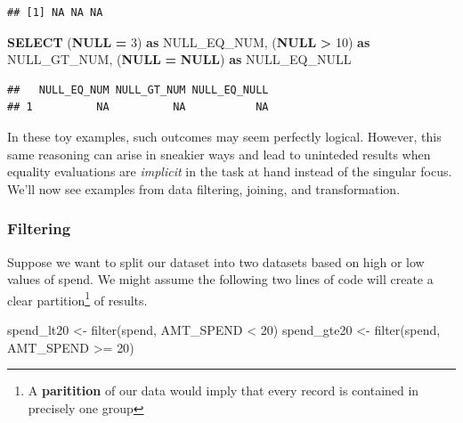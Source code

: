\documentclass[
]{krantz}
\makeatletter
\newenvironment{Shaded}{\begin{snugshade}}{\end{snugshade}}
\newcommand{\DecValTok}[1]{\textcolor[rgb]{0.06,0.06,0.06}{#1}}
\newcommand{\FunctionTok}[1]{\textcolor[rgb]{0,0,0}{#1}}
\newcommand{\KeywordTok}[1]{\textcolor[rgb]{0.27,0.27,0.27}{\textbf{#1}}}
\newcommand{\NormalTok}[1]{#1}
\newcommand{\OperatorTok}[1]{\textcolor[rgb]{0.43,0.43,0.43}{\textbf{#1}}}
\newcommand{\OtherTok}[1]{\textcolor[rgb]{0.37,0.37,0.37}{#1}}
\newcommand{\SpecialCharTok}[1]{\textcolor[rgb]{0,0,0}{#1}}
\newenvironment{kframe}{%
\medskip{}
\setlength{\fboxsep}{.8em}
 \def\at@end@of@kframe{}%
 \ifinner\ifhmode%
  \def\at@end@of@kframe{\end{minipage}}%
  \begin{minipage}{\columnwidth}%
 \fi\fi%
 \def\FrameCommand##1{\hskip\@totalleftmargin \hskip-\fboxsep
 \colorbox{shadecolor}{##1}\hskip-\fboxsep
     \hskip-\linewidth \hskip-\@totalleftmargin \hskip\columnwidth}%
 \MakeFramed {\advance\hsize-\width
   \@totalleftmargin\z@ \linewidth\hsize
   \@setminipage}}%
 {\par\unskip\endMakeFramed%
 \at@end@of@kframe}
\renewenvironment{Shaded}{\begin{kframe}}{\end{kframe}}
\makeatother
\begin{document}
\begin{verbatim}
## [1] NA NA NA
\end{verbatim}

\begin{Shaded}
\begin{Highlighting}[]
\KeywordTok{SELECT}
\NormalTok{  (}\KeywordTok{NULL} \OperatorTok{=} \DecValTok{3}\NormalTok{) }\KeywordTok{as}\NormalTok{ NULL\_EQ\_NUM,}
\NormalTok{  (}\KeywordTok{NULL} \OperatorTok{\textgreater{}} \DecValTok{10}\NormalTok{) }\KeywordTok{as}\NormalTok{ NULL\_GT\_NUM,}
\NormalTok{  (}\KeywordTok{NULL} \OperatorTok{=} \KeywordTok{NULL}\NormalTok{) }\KeywordTok{as}\NormalTok{ NULL\_EQ\_NULL}
\end{Highlighting}
\end{Shaded}

\begin{verbatim}
##   NULL_EQ_NUM NULL_GT_NUM NULL_EQ_NULL
## 1          NA          NA           NA
\end{verbatim}

In these toy examples, such outcomes may seem perfectly logical.
However, this same reasoning can arise in sneakier ways and lead to uninteded results when equality evaluations are \emph{implicit} in the task at hand instead of the singular focus.
We'll now see examples from data filtering, joining, and transformation.

\hypertarget{filtering}{%
\subsubsection{Filtering}\label{filtering}}

Suppose we want to split our dataset into two datasets based on high or low values of spend.
We might assume the following two lines of code will create a clear partition\footnote{A \textbf{paritition} of our data would imply that every record is contained in precisely one group} of results.

\begin{Shaded}
\begin{Highlighting}[]
\NormalTok{spend\_lt20 }\OtherTok{\textless{}{-}} \FunctionTok{filter}\NormalTok{(spend, AMT\_SPEND }\SpecialCharTok{\textless{}} \DecValTok{20}\NormalTok{)}
\NormalTok{spend\_gte20 }\OtherTok{\textless{}{-}} \FunctionTok{filter}\NormalTok{(spend, AMT\_SPEND }\SpecialCharTok{\textgreater{}=} \DecValTok{20}\NormalTok{)}
\end{Highlighting}
\end{Shaded}
\end{document}
